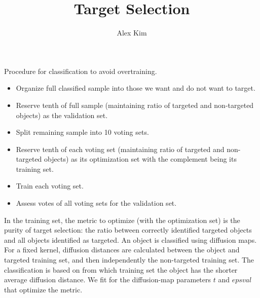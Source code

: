 \documentclass[preprint]{aastex}
\begin{document}
\title{Target Selection}
\author{Alex Kim}

Procedure for classification to avoid overtraining.
\begin{itemize}
\item Organize full classified sample into those we want and do not want to target.
\item Reserve tenth of full sample (maintaining ratio of targeted and non-targeted objects) as the validation set.
\item Split remaining sample into 10 voting sets.
\item Reserve tenth of each voting set  (maintaining ratio of targeted and non-targeted objects) as its optimization set with the complement being its training set.
\item Train each voting set. 
\item Assess votes of all voting sets for the validation set.
\end{itemize}

In the training set, the metric to optimize (with the optimization set) is the purity of target selection: the ratio between correctly identified targeted objects and
all objects identified as targeted.  An object is classified using diffusion maps.  For a fixed kernel, diffusion distances are calculated 
between the object and targeted training set, and then independently the non-targeted training set.  The classification is based on from which training set
the object has the shorter average diffusion distance.
We fit for the diffusion-map parameters  $t$ and $epsval$ that optimize the metric.
\end{document}
